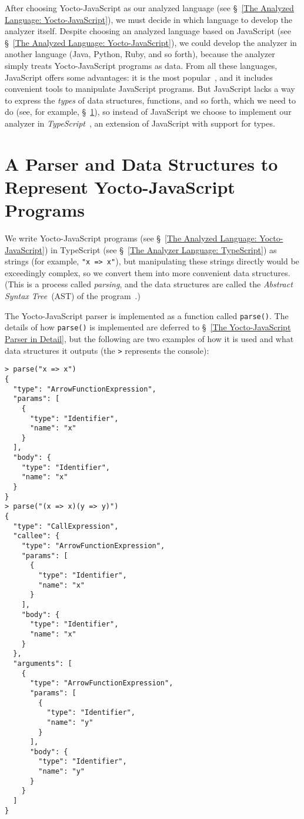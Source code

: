 \documentclass[12pt, oneside]{book}
\begin{document}
After choosing Yocto-JavaScript as our analyzed language (see §~\ref{The Analyzed Language: Yocto-JavaScript}), we must decide in which language to develop the analyzer itself. Despite choosing an analyzed language based on JavaScript (see §~\ref{The Analyzed Language: Yocto-JavaScript}), we could develop the analyzer in another language (Java, Python, Ruby, and so forth), because the analyzer simply treats Yocto-JavaScript programs as data. From all these languages, JavaScript offers some advantages: it is the most popular~\cite{stack-overflow-developer-survey, jet-brains-developer-survey}, and it includes convenient tools to manipulate JavaScript programs. But JavaScript lacks a way to express the \emph{types} of data structures, functions, and so forth, which we need to do (see, for example, §~\ref{A Parser and Data Structures to Represent Yocto-JavaScript Programs}), so instead of JavaScript we choose to implement our analyzer in \emph{TypeScript}~\cite{typescript, typescript-deep-dive, understanding-typescript}, an extension of JavaScript with support for types.

\section{A Parser and Data Structures to Represent Yocto-JavaScript Programs}
\label{A Parser and Data Structures to Represent Yocto-JavaScript Programs}

We write Yocto-JavaScript programs (see §~\ref{The Analyzed Language: Yocto-JavaScript}) in TypeScript (see §~\ref{The Analyzer Language: TypeScript}) as strings (for example, \texttt{"x => x"}), but manipulating these strings directly would be exceedingly complex, so we convert them into more convenient data structures. (This is a process called \emph{parsing}, and the data structures are called the \emph{Abstract Syntax Tree}~(AST) of the program~\cite[§~4]{dragon-book}.)

The Yocto-JavaScript parser is implemented as a function called \texttt{parse()}. The details of how \texttt{parse()} is implemented are deferred to §~\ref{The Yocto-JavaScript Parser in Detail}, but the following are two examples of how it is used and what data structures it outputs (the \texttt{>} represents the console):

\begin{verbatim}
> parse("x => x")
{
  "type": "ArrowFunctionExpression",
  "params": [
    {
      "type": "Identifier",
      "name": "x"
    }
  ],
  "body": {
    "type": "Identifier",
    "name": "x"
  }
}
> parse("(x => x)(y => y)")
{
  "type": "CallExpression",
  "callee": {
    "type": "ArrowFunctionExpression",
    "params": [
      {
        "type": "Identifier",
        "name": "x"
      }
    ],
    "body": {
      "type": "Identifier",
      "name": "x"
    }
  },
  "arguments": [
    {
      "type": "ArrowFunctionExpression",
      "params": [
        {
          "type": "Identifier",
          "name": "y"
        }
      ],
      "body": {
        "type": "Identifier",
        "name": "y"
      }
    }
  ]
}
\end{verbatim}
\end{document}

